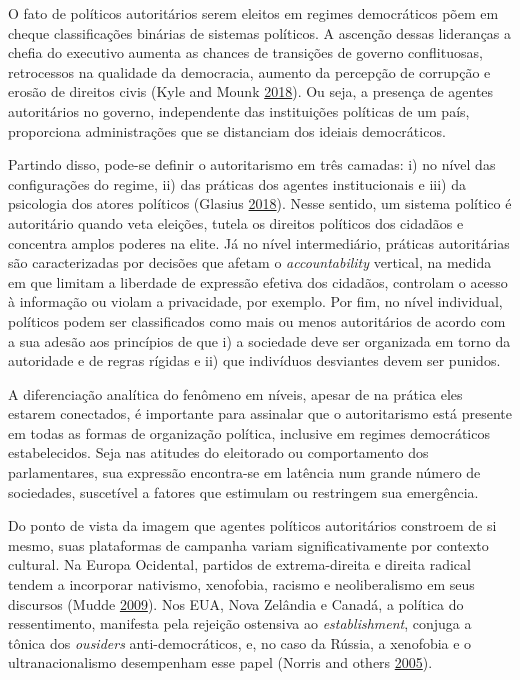 \documentclass[12 pt,]{article}
\begin{document}
O fato de políticos autoritários serem eleitos em regimes democráticos
põem em cheque classificações binárias de sistemas políticos. A ascenção
dessas lideranças a chefia do executivo aumenta as chances de transições
de governo conflituosas, retrocessos na qualidade da democracia, aumento
da percepção de corrupção e erosão de direitos civis (Kyle and Mounk
\protect\hyperlink{ref-mounk2018thepopulist}{2018}). Ou seja, a presença
de agentes autoritários no governo, independente das instituições
políticas de um país, proporciona administrações que se distanciam dos
ideiais democráticos.

Partindo disso, pode-se definir o autoritarismo em três camadas: i) no
nível das configurações do regime, ii) das práticas dos agentes
institucionais e iii) da psicologia dos atores políticos (Glasius
\protect\hyperlink{ref-glasius2018authoritarianism}{2018}). Nesse
sentido, um sistema político é autoritário quando veta eleições, tutela
os direitos políticos dos cidadãos e concentra amplos poderes na elite.
Já no nível intermediário, práticas autoritárias são caracterizadas por
decisões que afetam o \emph{accountability} vertical, na medida em que
limitam a liberdade de expressão efetiva dos cidadãos, controlam o
acesso à informação ou violam a privacidade, por exemplo. Por fim, no
nível individual, políticos podem ser classificados como mais ou menos
autoritários de acordo com a sua adesão aos princípios de que i) a
sociedade deve ser organizada em torno da autoridade e de regras rígidas
e ii) que indivíduos desviantes devem ser punidos.

A diferenciação analítica do fenômeno em níveis, apesar de na prática
eles estarem conectados, é importante para assinalar que o autoritarismo
está presente em todas as formas de organização política, inclusive em
regimes democráticos estabelecidos. Seja nas atitudes do eleitorado ou
comportamento dos parlamentares, sua expressão encontra-se em latência
num grande número de sociedades, suscetível a fatores que estimulam ou
restringem sua emergência.

Do ponto de vista da imagem que agentes políticos autoritários constroem
de si mesmo, suas plataformas de campanha variam significativamente por
contexto cultural. Na Europa Ocidental, partidos de extrema-direita e
direita radical tendem a incorporar nativismo, xenofobia, racismo e
neoliberalismo em seus discursos (Mudde
\protect\hyperlink{ref-mudde2009populist}{2009}). Nos EUA, Nova Zelândia
e Canadá, a política do ressentimento, manifesta pela rejeição ostensiva
ao \emph{establishment}, conjuga a tônica dos \emph{ousiders}
anti-democráticos, e, no caso da Rússia, a xenofobia e o
ultranacionalismo desempenham esse papel (Norris and others
\protect\hyperlink{ref-norris2005radical}{2005}).
\end{document}
